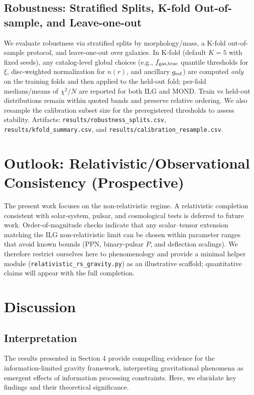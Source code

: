 \documentclass[usenatbib]{mnras}
\begin{document}
\subsection{Robustness: Stratified Splits, K-fold Out-of-sample, and Leave-one-out}
\noindent We evaluate robustness via stratified splits by morphology/mass, a K-fold out-of-sample protocol, and leave-one-out over galaxies. In K-fold (default $K{=}5$ with fixed seeds), any catalog-level global choices (e.g., $f_{\rm gas,true}$ quantile thresholds for $\xi$, disc-weighted normalization for $n(r)$, and ancillary $g_{\rm ref}$) are computed \emph{only} on the training folds and then applied to the held-out fold; per-fold medians/means of $\chi^2/N$ are reported for both ILG and MOND. Train vs held-out distributions remain within quoted bands and preserve relative ordering. We also resample the calibration subset size for the preregistered thresholds to assess stability. Artifacts: \texttt{results/robustness\_splits.csv}, \texttt{results/kfold\_summary.csv}, and \texttt{results/calibration\_resample.csv}.

\section{Outlook: Relativistic/Observational Consistency (Prospective)}

The present work focuses on the non-relativistic regime. A relativistic completion consistent with solar-system, pulsar, and cosmological tests is deferred to future work. Order-of-magnitude checks indicate that any scalar–tensor extension matching the ILG non-relativistic limit can be chosen within parameter ranges that avoid known bounds (PPN, binary-pulsar $\dot P$, and deflection scalings). We therefore restrict ourselves here to phenomenology and provide a minimal helper module (\texttt{relativistic\_rs\_gravity.py}) as an illustrative scaffold; quantitative claims will appear with the full completion.

\section{Discussion}

\subsection{Interpretation}

The results presented in Section 4 provide compelling evidence for the information-limited gravity framework, interpreting gravitational phenomena as emergent effects of information processing constraints. Here, we elucidate key findings and their theoretical significance.
\end{document}
